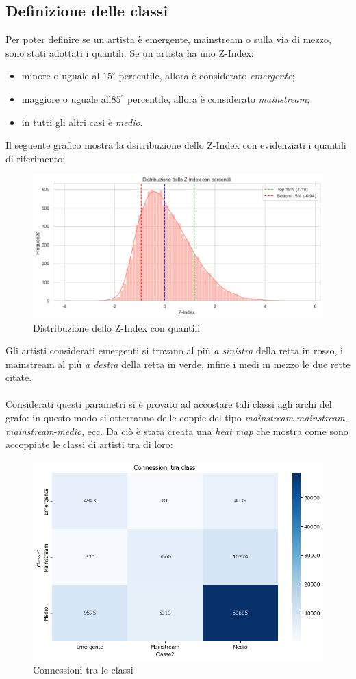 \documentclass[sigchi]{acmart}
\begin{document}
\subsection{Definizione delle classi}

Per poter definire se un artista è emergente, mainstream o sulla via di mezzo, sono stati adottati i quantili. Se un artista ha uno Z-Index:

\begin{itemize}
\item minore o uguale al $15^\circ$ percentile, allora è considerato {\itshape emergente};
\item maggiore o uguale all\textquotesingle$85^\circ$ percentile, allora è considerato {\itshape mainstream};
\item in tutti gli altri casi è {\itshape medio}.
\end{itemize}
Il seguente grafico mostra la dsitribuzione dello Z-Index con evidenziati i quantili di riferimento:

\begin{figure}[H]
\centering
\includegraphics[width=0.45
\textwidth]{../open_problem/plots/3_2/popDistPc.png}
\caption{Distribuzione dello Z-Index con quantili}
\label{fig:popDistPc}
\end{figure}

\noindent Gli artisti considerati emergenti si trovano al più {\itshape a sinistra} della retta in rosso, i mainstream al più {\itshape a destra} della retta in verde, infine i medi in mezzo le due rette citate. \\ \\ Considerati questi parametri si è provato ad accostare tali classi agli archi del grafo: in questo modo si otterranno delle coppie del tipo {\itshape mainstream}-{\itshape mainstream}, {\itshape mainstream}-{\itshape medio}, ecc. Da ciò è stata creata una {\itshape heat map} che mostra come sono accoppiate le classi di artisti tra di loro:

\begin{figure}[H]
\centering
\includegraphics[width=0.45
\textwidth]{../open_problem/plots/3_2/clConnection.png}
\caption{Connessioni tra le classi}
\label{fig:clConnection}
\end{figure}
\end{document}

